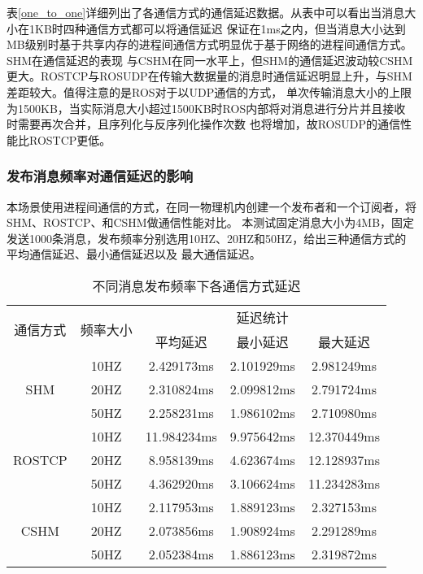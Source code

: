 表\ref{one_to_one}详细列出了各通信方式的通信延迟数据。从表中可以看出当消息大小在1KB时四种通信方式都可以将通信延迟
保证在1ms之内，但当消息大小达到MB级别时基于共享内存的进程间通信方式明显优于基于网络的进程间通信方式。SHM在通信延迟的表现
与CSHM在同一水平上，但SHM的通信延迟波动较CSHM更大。ROSTCP与ROSUDP在传输大数据量的消息时通信延迟明显上升，与SHM差距较大。值得注意的是ROS对于以UDP通信的方式，
单次传输消息大小的上限为1500KB，当实际消息大小超过1500KB时ROS内部将对消息进行分片并且接收时需要再次合并，且序列化与反序列化操作次数
也将增加，故ROSUDP的通信性能比ROSTCP更低。

\subsubsection{发布消息频率对通信延迟的影响}
本场景使用进程间通信的方式，在同一物理机内创建一个发布者和一个订阅者，将SHM、ROSTCP、和CSHM做通信性能对比。
本测试固定消息大小为4MB，固定发送1000条消息，发布频率分别选用10HZ、20HZ和50HZ，给出三种通信方式的平均通信延迟、最小通信延迟以及
最大通信延迟。

\begin{table}[htb]
  \centering\small
  \caption{不同消息发布频率下各通信方式延迟}
  \renewcommand\arraystretch{1.2}
  \label{frequency_test}
  \begin{tabular}{ccccc}
    \toprule
    \multirow{2}{*}{通信方式} & \multirow{2}{*}{频率大小} & \multicolumn{3}{c}{延迟统计}\\
     & & 平均延迟 & 最小延迟 & 最大延迟\\
    \midrule
    \multirow{3}{*}{SHM} & 10HZ& 2.429173ms& 2.101929ms& 2.981249ms\\ & 20HZ & 2.310824ms & 2.099812ms & 2.791724ms \\ & 50HZ & 2.258231ms & 1.986102ms & 2.710980ms \\
    \hline
    \multirow{3}{*}{ROSTCP} & 10HZ& 11.984234ms& 9.975642ms& 12.370449ms\\ & 20HZ & 8.958139ms & 4.623674ms & 12.128937ms \\ & 50HZ & 4.362920ms & 3.106624ms & 11.234283ms \\
    \hline
    \multirow{3}{*}{CSHM} & 10HZ& 2.117953ms& 1.889123ms& 2.327153ms\\ & 20HZ & 2.073856ms & 1.908924ms & 2.291289ms \\ & 50HZ & 2.052384ms & 1.886123ms & 2.319872ms \\
    \bottomrule
  \end{tabular}
\end{table}

